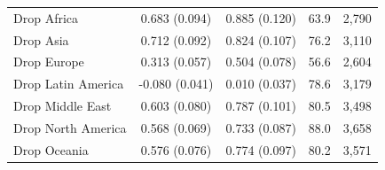 \begin{tabular}{lcccc}
Drop Africa & 0.683\sym{***} (0.094) & 0.885\sym{***} (0.120) & 63.9 & 2,790 \\
Drop Asia & 0.712\sym{***} (0.092) & 0.824\sym{***} (0.107) & 76.2 & 3,110 \\
Drop Europe & 0.313\sym{***} (0.057) & 0.504\sym{***} (0.078) & 56.6 & 2,604 \\
Drop Latin America & -0.080\sym{**} (0.041) & 0.010 (0.037) & 78.6 & 3,179 \\
Drop Middle East & 0.603\sym{***} (0.080) & 0.787\sym{***} (0.101) & 80.5 & 3,498 \\
Drop North America & 0.568\sym{***} (0.069) & 0.733\sym{***} (0.087) & 88.0 & 3,658 \\
Drop Oceania & 0.576\sym{***} (0.076) & 0.774\sym{***} (0.097) & 80.2 & 3,571 \\
\bottomrule
\end{tabular}